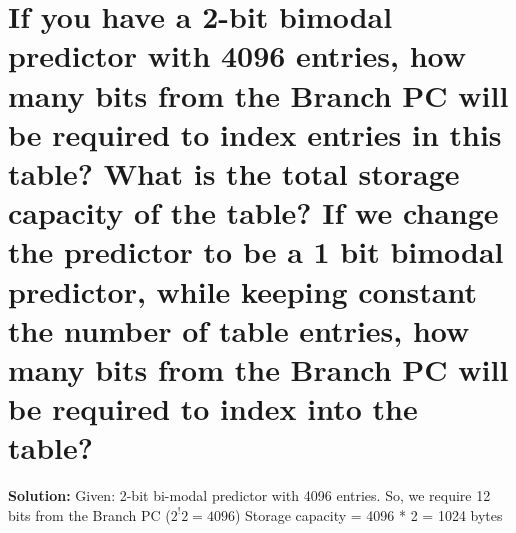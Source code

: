 \documentclass[11pt]{article}
\begin{document}
\section* {If you have a 2-bit bimodal predictor with 4096 entries, how many bits from the Branch PC will be required to index entries in this table? What is the total storage capacity of the table? If we change the predictor to be a 1 bit bimodal predictor, while keeping constant the number of table entries, how many bits from the Branch PC will be required to index into the table? }
\nelwine 
\textbf{Solution: } Given: 2-bit bi-modal predictor with 4096 entries.
\newline 
So, we require 12 bits from the Branch PC ($2^!2 = 4096$)
\newline 
Storage capacity = 4096 * 2 = 1024 bytes 
\end{document}
